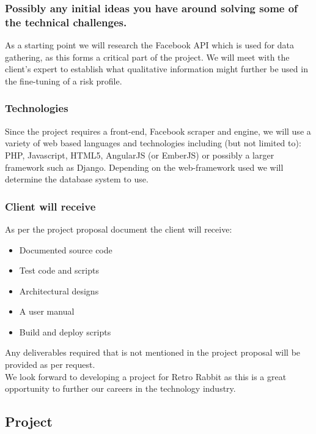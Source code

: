 \documentclass{article}
\begin{document}
	\subsubsection{Possibly any initial ideas you have around solving some of the technical challenges.}
	As a starting point we will research the Facebook API which is used for data gathering, as this forms a critical part of the project. We will meet with the client's expert to establish what qualitative information might further be used in the fine-tuning of a risk profile.
	
	\subsubsection{Technologies}
	Since the project requires a front-end, Facebook scraper and engine, we will use a variety of web based languages and technologies including (but not limited to): PHP, Javascript, HTML5, AngularJS (or EmberJS) or possibly a larger framework such as Django. Depending on the web-framework used we will determine the database system to use. 
	
	\subsubsection{Client will receive}
	As per the project proposal document the client will receive:
	\begin{itemize}
		\item Documented source code
		\item Test code and scripts
		\item Architectural designs
		\item A user manual
		\item Build and deploy scripts
	\end{itemize}
	Any deliverables required that is not mentioned in the project proposal will be provided as per request.\\
	
	We look forward to developing a project for Retro Rabbit as this is a great opportunity to further our  careers in the technology industry.
	
	\subsection{Project }
\end{document}
